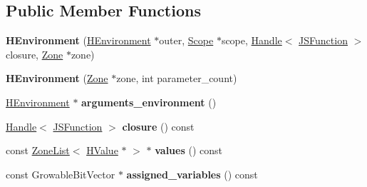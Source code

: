 \subsection*{Public Member Functions}
\begin{DoxyCompactItemize}
\item 
{\bfseries H\+Environment} (\hyperlink{classv8_1_1internal_1_1_h_environment}{H\+Environment} $\ast$outer, \hyperlink{classv8_1_1internal_1_1_scope}{Scope} $\ast$scope, \hyperlink{classv8_1_1internal_1_1_handle}{Handle}$<$ \hyperlink{classv8_1_1internal_1_1_j_s_function}{J\+S\+Function} $>$ closure, \hyperlink{classv8_1_1internal_1_1_zone}{Zone} $\ast$zone)\hypertarget{classv8_1_1internal_1_1_h_environment_a8a540a531d9f4b90d14a244276c034d9}{}\label{classv8_1_1internal_1_1_h_environment_a8a540a531d9f4b90d14a244276c034d9}

\item 
{\bfseries H\+Environment} (\hyperlink{classv8_1_1internal_1_1_zone}{Zone} $\ast$zone, int parameter\+\_\+count)\hypertarget{classv8_1_1internal_1_1_h_environment_ab2ce06fb111510eefce7e85d33e101d6}{}\label{classv8_1_1internal_1_1_h_environment_ab2ce06fb111510eefce7e85d33e101d6}

\item 
\hyperlink{classv8_1_1internal_1_1_h_environment}{H\+Environment} $\ast$ {\bfseries arguments\+\_\+environment} ()\hypertarget{classv8_1_1internal_1_1_h_environment_ace0571e82d5f6f6a0b683aac83f3aba8}{}\label{classv8_1_1internal_1_1_h_environment_ace0571e82d5f6f6a0b683aac83f3aba8}

\item 
\hyperlink{classv8_1_1internal_1_1_handle}{Handle}$<$ \hyperlink{classv8_1_1internal_1_1_j_s_function}{J\+S\+Function} $>$ {\bfseries closure} () const \hypertarget{classv8_1_1internal_1_1_h_environment_a3a759f9a9576e8cadc1652cb03d9b8c4}{}\label{classv8_1_1internal_1_1_h_environment_a3a759f9a9576e8cadc1652cb03d9b8c4}

\item 
const \hyperlink{classv8_1_1internal_1_1_zone_list}{Zone\+List}$<$ \hyperlink{classv8_1_1internal_1_1_h_value}{H\+Value} $\ast$ $>$ $\ast$ {\bfseries values} () const \hypertarget{classv8_1_1internal_1_1_h_environment_a04b9fc1678bca2cb051b5a793819db99}{}\label{classv8_1_1internal_1_1_h_environment_a04b9fc1678bca2cb051b5a793819db99}

\item 
const Growable\+Bit\+Vector $\ast$ {\bfseries assigned\+\_\+variables} () const \hypertarget{classv8_1_1internal_1_1_h_environment_a7cf5b4e145158545d23daaa2e568b35d}{}\label{classv8_1_1internal_1_1_h_environment_a7cf5b4e145158545d23daaa2e568b35d}


\end{DoxyCompactItemize}
